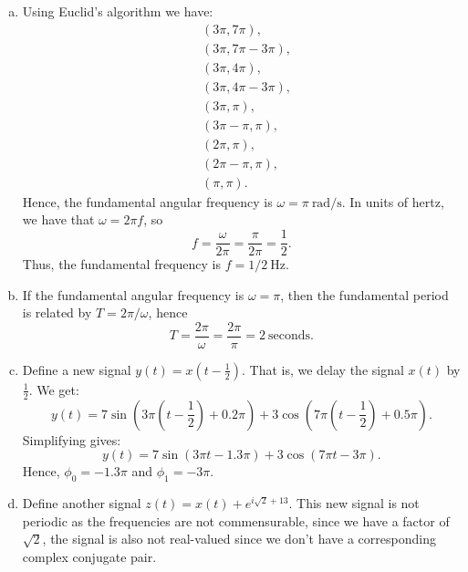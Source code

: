 \begin{enumerate}
\begin{enumerate}[a)]
          \item Using Euclid's algorithm we have:
                \begin{align*}
                   & (3\pi,7\pi),      \\
                   & (3\pi,7\pi-3\pi), \\
                   & (3\pi,4\pi),      \\
                   & (3\pi,4\pi-3\pi), \\
                   & (3\pi,\pi),       \\
                   & (3\pi-\pi,\pi),   \\
                   & (2\pi,\pi),       \\
                   & (2\pi-\pi,\pi),   \\
                   & (\pi,\pi).
                \end{align*}
                Hence, the fundamental angular frequency is $\omega=\pi\ \text{rad/s}$. 
                In units of hertz, we have that $\omega=2\pi f$, so
                \[ f = \frac{\omega}{2\pi}=\frac{\pi}{2\pi}=\frac{1}{2}. \]
                Thus, the fundamental frequency is $f=1/2\ \text{Hz}$.

          \item If the fundamental angular frequency is $\omega=\pi$, then the fundamental period is related by $T=2\pi/\omega$, hence
                \[ T = \frac{2\pi}{\omega}=\frac{2\pi}{\pi}=2\ \text{seconds}. \]

          \item Define a new signal $y(t)=x(t-\frac{1}{2})$. That is, we delay the signal $x(t)$ by $\frac{1}{2}$. We get:
                \[ y(t) = 7\sin(3\pi \left(t-\frac{1}{2}\right)+0.2\pi) + 3\cos(7\pi \left(t-\frac{1}{2}\right)+0.5\pi). \]
                Simplifying gives:
                \[ y(t) = 7\sin(3\pi t-1.3\pi) + 3\cos(7\pi t-3\pi). \]
                Hence, $\phi_{0} = -1.3\pi$ and $\phi_{1}=-3\pi$.

          \item Define another signal $z(t) = x(t) + e^{i\sqrt{2}+13}$. 
                This new signal is not periodic as the frequencies are not commensurable, since we have a factor of $\sqrt{2}$, 
                the signal is also not real-valued since we don't have a corresponding complex conjugate pair.
        \end{enumerate}


\end{enumerate}
